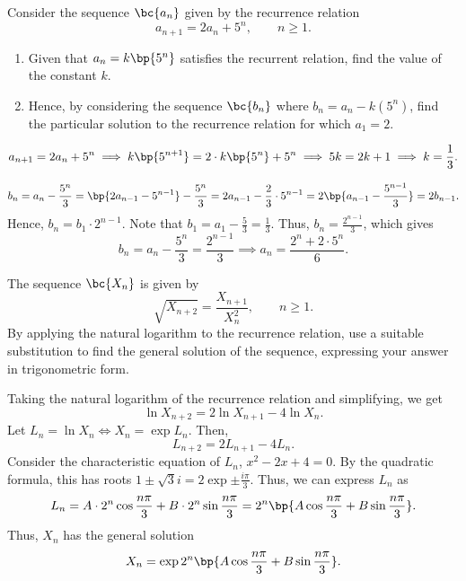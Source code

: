 \clearpage
\begin{problem}
    Consider the sequence $\bc{a_n}$ given by the recurrence relation \[a_{n+1} = 2a_n + 5^n, \qquad n \geq 1.\]

    \begin{enumerate}
        \item Given that $a_n = k\bp{5^n}$ satisfies the recurrent relation, find the value of the constant $k$.
        \item Hence, by considering the sequence $\bc{b_n}$ where $b_n = a_n - k(5^n)$, find the particular solution to the recurrence relation for which $a_1 = 2$.
    \end{enumerate}
\end{problem}
\begin{solution}
    \begin{ppart}
        \[a_{n+1} = 2a_n + 5^n \implies k\bp{5^{n+1}} = 2\cdot k\bp{5^n} + 5^n \implies 5k = 2k + 1 \implies k = \frac13.\]
    \end{ppart}
    \begin{ppart}
        \[b_n = a_n - \frac{5^n}3 = \bp{2a_{n-1} - 5^{n-1}} - \frac{5^n}3 = 2a_{n-1} - \frac23 \cdot 5^{n-1} = 2\bp{a_{n-1} - \frac{5^{n-1}}3} = 2b_{n-1}.\] Hence, $b_n = b_1 \cdot 2^{n-1}$. Note that $b_1 = a_1 - \frac53 = \frac13$. Thus, $b_n = \frac{2^{n-1}}3$, which gives 
        \[b_n = a_n - \frac{5^n}{3} = \frac{2^{n-1}}3 \implies a_n = \frac{2^n + 2 \cdot 5^n}6.\]
    \end{ppart}
\end{solution}

\begin{problem}
    The sequence $\bc{X_n}$ is given by \[\sqrt{X_{n+2}} = \frac{X_{n+1}}{X_n^2}, \qquad n \geq 1.\] By applying the natural logarithm to the recurrence relation, use a suitable substitution to find the general solution of the sequence, expressing your answer in trigonometric form.
\end{problem}
\begin{solution}
    Taking the natural logarithm of the recurrence relation and simplifying, we get \[\ln X_{n+2} = 2\ln X_{n+1} - 4\ln X_n.\] Let $L_n = \ln X_n \iff X_n = \exp{L_n}$. Then, \[L_{n+2} = 2L_{n+1} - 4L_n.\] Consider the characteristic equation of $L_n$, $x^2 - 2x + 4 = 0$. By the quadratic formula, this has roots $1 \pm \sqrt3 i = 2\exp{\pm \frac{i\pi}3}$. Thus, we can express $L_n$ as \[L_n = A \cdot 2^n \cos \frac{n\pi}3 + B \cdot 2^n \sin\frac{n\pi}3 = 2^n \bp{A \cos \frac{n\pi}3 + B \sin \frac{n\pi}3}.\] Thus, $X_n$ has the general solution \[X_n = \exp{2^n \bp{A \cos\frac{n\pi}3 + B \sin \frac{n\pi}3}}.\]
\end{solution}

